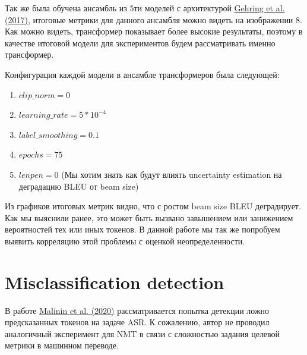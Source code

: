 \documentclass[a4paper,14pt]{extarticle}
\newcommand{\bibref}[3]{\hyperlink{#1}{#2 (#3)}}
\begin{document}
	Так же была обучена ансамбль из 5ти моделей с архитектурой \bibref{fconv}{Gehring et al.}{2017}, итоговые метрики для данного ансамбля можно видеть на изображении 8. Как можно видеть, трансформер показывает более высокие результаты, поэтому в качестве итоговой модели для экспериментов будем рассматривать именно трансформер.
	
	\begin{figure}[t]
	\end{figure}
	
	Конфигурация каждой модели в ансамбле трансформеров была следующей:
	\begin{enumerate}
		\item $clip\_norm = 0$
		\item $learning\_rate=5*10^{-4}$
		\item $label\_smoothing=0.1$
		\item $epochs=75$
		\item $lenpen=0$ (Мы хотим знать как будут влиять uncertainty estimation на деградацию BLEU от  beam size)
	\end{enumerate}
	
	Из графиков итоговых метрик видно, что с ростом beam size BLEU деградирует. Как мы выяснили ранее, это может быть вызвано завышением или занижением вероятностей тех или иных токенов. В данной работе мы так же попробуем выявить корреляцию этой проблемы с оценкой неопределенности.
	
\section{Misclassification detection}
	В работе \bibref{uncertainty}{Malinin et al.}{2020} рассматривается попытка детекции ложно предсказанных токенов на задаче ASR. К сожалению, автор не проводил аналогичный эксперимент для NMT в связи с сложностью задания целевой метрики в машинном переводе.
	
\end{document}
